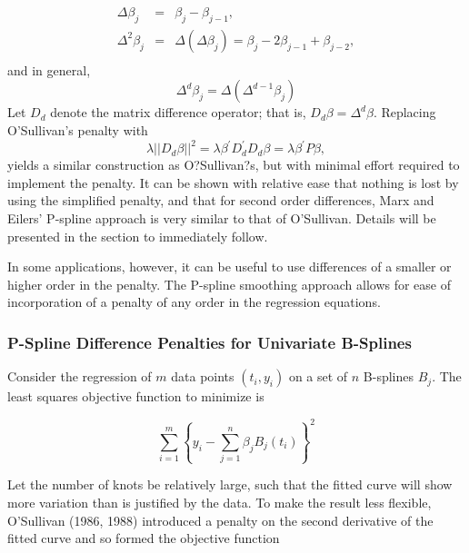 \documentclass[12pt]{article}
\newcommand*\needsparaphrased{\color{red}}
\newcommand*\outlineskeleton{\color{green}}
\begin{document}
 \begin{eqnarray*}
 \Delta \beta_j &=& \beta_j - \beta_{j-1},\\
 \Delta^2 \beta_j &=& \Delta\left(\Delta \beta_j\right) = \beta_j - 2\beta_{j-1} + \beta_{j-2},\\ 
 \end{eqnarray*}
\noindent 
and in general,
\begin{equation*}
\Delta^d \beta_j = \Delta\left(\Delta^{d-1} \beta_j \right)
\end{equation*}
 Let $D_d$ denote the matrix difference operator; that is, $D_d\beta = \Delta^d \beta$. Replacing O'Sullivan's penalty with 
 \[
 \lambda\vert \vert D_d\beta\vert \vert^2 = \lambda \beta^\prime D^\prime_d D_d \beta = \lambda \beta^\prime P\beta,
 \] 
 \noindent
yields a similar construction as O?Sullivan?s, but with minimal effort required to implement the penalty. It can be shown with relative ease that nothing is lost by using the simplified penalty, and that for second order differences, Marx and Eilers' P-spline approach is very similar to that of O'Sullivan. Details will be presented in the section to immediately follow.
 
 In some applications, however, it can be useful to use differences of a smaller or higher order in the penalty. The P-spline smoothing approach allows for ease of incorporation of a penalty of any order in the regression equations. 

\subsubsection{{\outlineskeleton P-Spline Difference Penalties for Univariate B-Splines}} \label{uni_pspline_penalties}

Consider the regression of $m$ data points $\left(t_i,y_i\right)$ on a set of $n$ B-splines $B_j$. The least squares objective function to minimize is

\begin{equation} \label{eq:univariate_bspline_SSE}
\sum_{i=1}^m \left\{ y_i - \sum_{j=1}^n \beta_j B_j\left(t_i\right) \right\}^2
\end{equation}
\noindent

{ \needsparaphrased Let the number of knots be relatively large, such that the fitted curve will show more variation than is justified by the data. To make the result less flexible, O'Sullivan (1986, 1988) introduced a penalty on the second derivative of the fitted curve and so formed the objective function}
\end{document}
